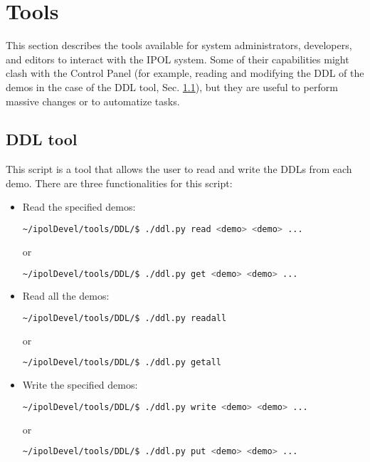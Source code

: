 \section{Tools}
This section describes the tools available for system administrators, developers, and editors to interact with the IPOL system. Some of their capabilities might clash with the Control Panel (for example, reading and modifying the DDL of the demos in the case of the DDL tool, Sec. \ref{sec:ddl_tool}), but they are useful to perform massive changes or to automatize tasks.


\subsection{DDL tool}
\label{sec:ddl_tool}
This script is a tool that allows the user to read and write the DDLs from each demo. There are three functionalities for this script:
\begin{itemize}

\item Read the specified demos:
\begin{lstlisting}[language=Bash]
~/ipolDevel/tools/DDL/$ ./ddl.py read <demo> <demo> ...
\end{lstlisting}
or
\begin{lstlisting}[language=Bash]
~/ipolDevel/tools/DDL/$ ./ddl.py get <demo> <demo> ...
\end{lstlisting}

\item Read all the demos:
\begin{lstlisting}[language=Bash]
~/ipolDevel/tools/DDL/$ ./ddl.py readall
\end{lstlisting}
or
\begin{lstlisting}[language=Bash]
~/ipolDevel/tools/DDL/$ ./ddl.py getall
\end{lstlisting}

\item Write the specified demos:
\begin{lstlisting}[language=Bash]
~/ipolDevel/tools/DDL/$ ./ddl.py write <demo> <demo> ...
\end{lstlisting}
or
\begin{lstlisting}[language=Bash]
~/ipolDevel/tools/DDL/$ ./ddl.py put <demo> <demo> ...
\end{lstlisting}
\end{itemize}